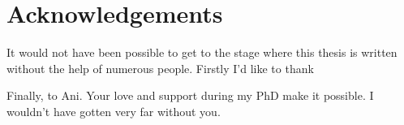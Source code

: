 %
%

\chapter*{Acknowledgements}
\begin{SingleSpace}
\par
It would not have been possible to get to the stage where this thesis is written without the help of numerous people.
Firstly I'd like to thank 


\par
Finally, to Ani.
Your love and support during my PhD make it possible.
I wouldn't have gotten very far without you.

\end{SingleSpace}
\clearpage